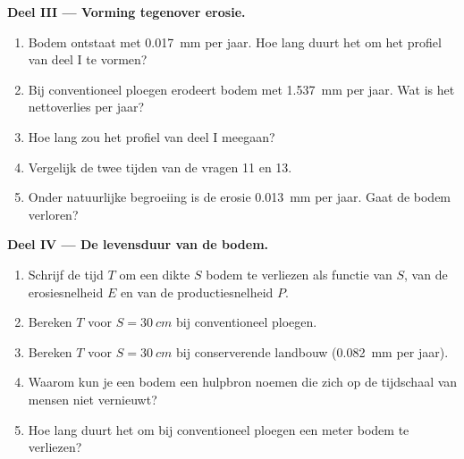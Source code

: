 \begin{problem}
\medskip
\noindent\textbf{Deel III --- Vorming tegenover erosie.}
\begin{enumerate}[resume]
  \item Bodem ontstaat met \qty{0.017}{mm} per jaar. Hoe lang duurt het om het
        profiel van deel I te vormen?
  \item Bij conventioneel ploegen erodeert bodem met \qty{1.537}{mm} per
        jaar. Wat is het nettoverlies per jaar?
  \item Hoe lang zou het profiel van deel I meegaan?
  \item Vergelijk de twee tijden van de vragen 11 en 13.
  \item Onder natuurlijke begroeiing is de erosie \qty{0.013}{mm} per jaar. Gaat
        de bodem verloren?
\end{enumerate}

\medskip
\noindent\textbf{Deel IV --- De levensduur van de bodem.}
\begin{enumerate}[resume]
  \item Schrijf de tijd $T$ om een dikte $S$ bodem te verliezen als functie van
        $S$, van de erosiesnelheid $E$ en van de productiesnelheid $P$.
  \item Bereken $T$ voor $S = \qty{30}{cm}$ bij conventioneel ploegen.
  \item Bereken $T$ voor $S = \qty{30}{cm}$ bij conserverende landbouw
        (\qty{0.082}{mm} per jaar).
  \item Waarom kun je een bodem een hulpbron noemen die zich op de tijdschaal van
        mensen niet vernieuwt?
  \item Hoe lang duurt het om bij conventioneel ploegen een meter bodem te
        verliezen?
\end{enumerate}
\end{problem}
